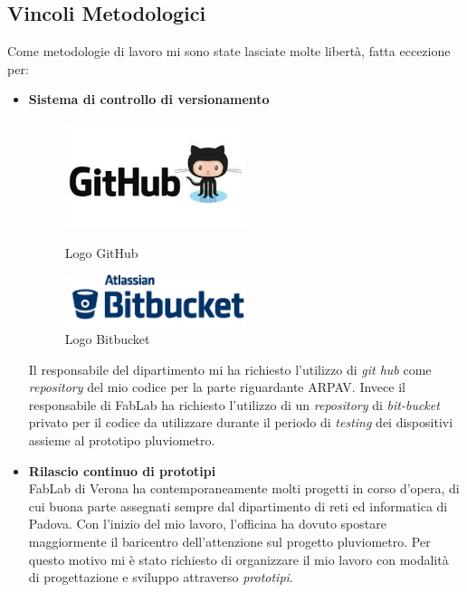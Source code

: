 \subsection{Vincoli Metodologici}

Come metodologie di lavoro mi sono state lasciate molte libertà, fatta eccezione per:

\begin{itemize}
	\item \textbf{Sistema di controllo di versionamento}\\
		\begin{figure}[htbp]
\centering
\begin{minipage}[c]{.45\textwidth}
	\centering\setlength{\captionmargin}{0pt}
	\includegraphics[width=0.50\textwidth]{./capitoli/capitolo2/img/github}
	\caption{Logo GitHub}
\end{minipage}
\hspace{10mm}
\begin{minipage}[c]{.45\textwidth}
	\centering\setlength{\captionmargin}{0pt}%
	\includegraphics[width=0.50\textwidth]{./capitoli/capitolo2/img/bitbucket}
	\caption{Logo Bitbucket}
\end{minipage}%

\end{figure}  
 Il responsabile del dipartimento mi ha richiesto l'utilizzo di \textit{git hub} come \textit{repository} del mio codice per la parte riguardante ARPAV. Invece il responsabile di FabLab ha richiesto l'utilizzo di un \textit{repository} di \textit{bit-bucket} privato per il codice da utilizzare durante il periodo di \textit{testing} dei dispositivi assieme al prototipo pluviometro.

\item \textbf{Rilascio continuo di prototipi}\\
	FabLab di Verona ha contemporaneamente molti progetti in corso d'opera, di cui buona parte assegnati sempre dal dipartimento di reti ed informatica di Padova. Con l'inizio del mio lavoro, l'officina ha dovuto spostare maggiormente il baricentro dell'attenzione sul progetto pluviometro. Per questo motivo mi è stato richiesto di organizzare il mio lavoro con modalità di progettazione e sviluppo attraverso \textit{prototipi}. 
	

\end{itemize}
